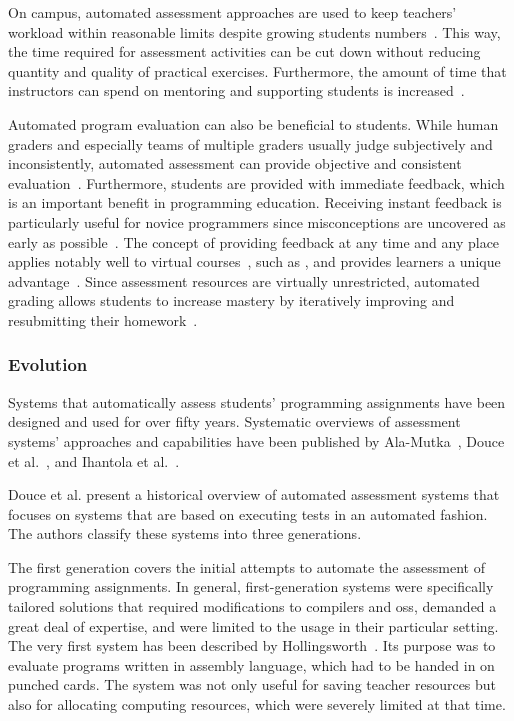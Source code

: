 On campus, automated assessment approaches are used to keep teachers' workload within reasonable limits despite growing students numbers~\cite{vogel2014quality}. This way, the time required for assessment activities can be cut down without reducing quantity and quality of practical exercises. Furthermore, the amount of time that instructors can spend on mentoring and supporting students is increased~\cite{vihavainen2013scaffolding}.

Automated program evaluation can also be beneficial to students. While human graders and especially teams of multiple graders usually judge subjectively and inconsistently, automated assessment can provide objective and consistent evaluation~\cite{ala2005survey}. Furthermore, students are provided with immediate feedback, which is an important benefit in programming education. Receiving instant feedback is particularly useful for novice programmers since misconceptions are uncovered as early as possible~\cite{vujovsevic2013software}. The concept of providing feedback at any time and any place applies notably well to virtual courses~\cite{malmi2002experiences}, such as \moocs, and provides learners a unique advantage~\cite{chauhan2014massive}. Since assessment resources are virtually unrestricted, automated grading allows students to increase mastery by iteratively improving and resubmitting their homework~\cite{fox2014software}.

\subsubsection{Evolution}

Systems that automatically assess students' programming assignments have been designed and used for over fifty years. Systematic overviews of assessment systems' approaches and capabilities have been published by Ala-Mutka~\cite{ala2005survey}, Douce et al.~\cite{douce2005automatic}, and Ihantola et al.~\cite{ihantola2010review}.

Douce et al. present a historical overview of automated assessment systems that focuses on systems that are based on executing tests in an automated fashion. The authors classify these systems into three generations.

The first generation covers the initial attempts to automate the assessment of programming assignments. In general, first-generation systems were specifically tailored solutions that required modifications to compilers and \glspl{os}, demanded a great deal of expertise, and were limited to the usage in their particular setting. The very first system has been described by Hollingsworth~\cite{hollingsworth1960automatic}. Its purpose was to evaluate programs written in assembly language, which had to be handed in on punched cards. The system was not only useful for saving teacher resources but also for allocating computing resources, which were severely limited at that time.

